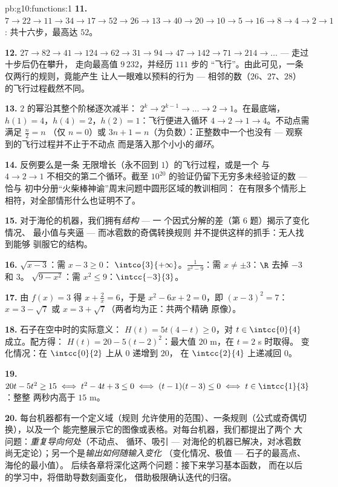 \begin{solution}{pb:g10:functions:1}
\textbf{11.} $7 \to 22 \to 11 \to 34 \to 17 \to 52 \to 26 \to
13 \to 40 \to 20 \to 10 \to 5 \to 16 \to 8 \to 4 \to 2 \to 1$:
共十六步，最高达 $52$。

\textbf{12.} $27 \to 82 \to 41 \to 124 \to 62 \to 31 \to 94 \to
47 \to 142 \to 71 \to 214 \to \dots$ --- 走过十步后仍在攀升，
走向最高值 $9\,232$，并经历 $111$ 步的
“飞行”。由此可见，一条仅两行的规则，竟能产生
让人一眼难以预料的行为 --- 相邻的数（$26$、$27$、$28$）
的飞行过程截然不同。

\textbf{13.} $2$ 的幂沿其整个阶梯逐次减半：
$2^k \to 2^{k-1} \to \dots \to 2 \to 1$。在最底端，
$h(1) = 4$，$h(4) = 2$，$h(2) = 1$：飞行便进入循环
$4 \to 2 \to 1 \to 4$。不动点需满足 $\frac n2 = n$
（仅 $n = 0$）或 $3n + 1 = n$（为负数）：正整数中一个也没有
--- 观察到的飞行过程并不止于不动点
而是落入那个小小的\emph{循环}。

\textbf{14.} 反例要么是一条
无限增长（永不回到 $1$）的飞行过程，或是一个
与 $4 \to 2 \to 1$ 不相交的第二个循环。截至
$10^{20}$ 的验证仍留下无穷多未经验证的数 --- 恰与
初中分册“火柴棒神谕”周末问题中圆形区域的教训相同：
在有限多个情形上相符，对全部情形什么也证明不了。

\textbf{15.} 对于海伦的机器，我们拥有\emph{结构} --- 一
个因式分解的差（第 6 题）揭示了变化情况、
最小值与夹逼 --- 而冰雹数的奇偶转换规则
并不提供这样的抓手：无人找到能够
驯服它的结构。

\textbf{16.} $\sqrt{x - 3}$：需 $x - 3 \geq 0$：
$\intco{3}{+\infty}$。$\frac{1}{x^2 - 9}$：需
$x \neq \pm 3$：$\R$ 去掉 $-3$ 和 $3$。
$\sqrt{9 - x^2}$：需 $x^2 \leq 9$：$\intcc{-3}{3}$。

\textbf{17.} 由 $f(x) = 3$ 得 $x + \frac2x = 6$，于是
$x^2 - 6x + 2 = 0$，即 $(x - 3)^2 = 7$：
$x = 3 - \sqrt7$ 或 $x = 3 + \sqrt7$（两者均为正：共两个精确
原像）。

\textbf{18.} 石子在空中时的实际意义：
$H(t) = 5t(4 - t) \geq 0$，对 $t \in \intcc{0}{4}$ 成立。配方得：
$H(t) = 20 - 5(t - 2)^2$：最大值 $20$ m，在 $t = 2$ s 时取得。
变化情况：在 $\intcc{0}{2}$ 上从 $0$ 递增到 $20$，
在 $\intcc{2}{4}$ 上递减回 $0$。

\textbf{19.} $20t - 5t^2 \geq 15 \iff t^2 - 4t + 3 \leq 0 \iff
(t - 1)(t - 3) \leq 0 \iff t \in \intcc{1}{3}$：整整
两秒内高于 $15$ m。

\textbf{20.} 每台机器都有一个定义域（规则
允许使用的范围）、一条规则（公式或奇偶切换），以及一个
能完整展示它的图像或表格。对每台机器，我们都提出了两个
大问题：\emph{重复导向何处}（不动点、
循环、吸引 --- 对海伦的机器已解决，对冰雹数
尚无定论）；另一个是\emph{输出如何随输入变化}
（变化情况、极值 --- 石子的最高点、海伦的最小值）。
后续各章将深化这两个问题：接下来学习基本函数，
而在以后的学习中，将借助导数刻画变化，
借助极限确认迭代的归宿。
\end{solution}
